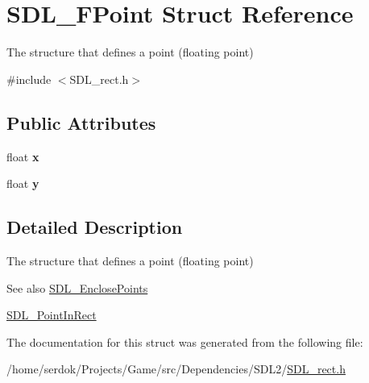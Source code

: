 \hypertarget{structSDL__FPoint}{}\section{S\+D\+L\+\_\+\+F\+Point Struct Reference}
\label{structSDL__FPoint}


The structure that defines a point (floating point)  




{\ttfamily \#include $<$S\+D\+L\+\_\+rect.\+h$>$}

\subsection*{Public Attributes}
\begin{DoxyCompactItemize}
\item 
\mbox{\label{structSDL__FPoint_a5211b32bdc9f5ac3b9972ab48418d6f3}} 
float {\bfseries x}
\item 
\mbox{\label{structSDL__FPoint_ac03695801666f08ee04b9d2e83f079ee}} 
float {\bfseries y}
\end{DoxyCompactItemize}


\subsection{Detailed Description}
The structure that defines a point (floating point) 

\begin{DoxySeeAlso}{See also}
\hyperlink{SDL__rect_8h_afcbb58dbba760b9e6fdb4b5d1ece015c}{S\+D\+L\+\_\+\+Enclose\+Points} 

\hyperlink{SDL__rect_8h_a2f9708f2739ef234c34e6feda50b4d2c}{S\+D\+L\+\_\+\+Point\+In\+Rect} 
\end{DoxySeeAlso}


The documentation for this struct was generated from the following file\+:\begin{DoxyCompactItemize}
\item 
/home/serdok/\+Projects/\+Game/src/\+Dependencies/\+S\+D\+L2/\hyperlink{SDL__rect_8h}{S\+D\+L\+\_\+rect.\+h}\end{DoxyCompactItemize}
